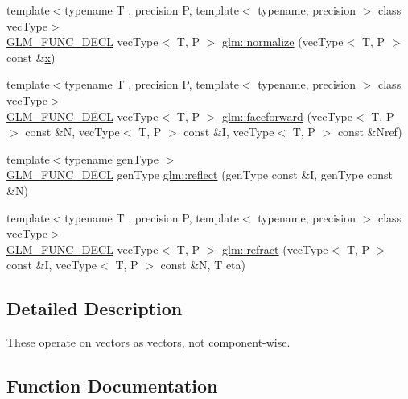 \begin{DoxyCompactItemize}
\item 
{\footnotesize template$<$typename T , precision P, template$<$ typename, precision $>$ class vec\+Type$>$ }\\\mbox{\hyperlink{setup_8hpp_ab2d052de21a70539923e9bcbf6e83a51}{G\+L\+M\+\_\+\+F\+U\+N\+C\+\_\+\+D\+E\+CL}} vec\+Type$<$ T, P $>$ \mbox{\hyperlink{group__core__func__geometric_gada9451ec170a36fe53552812b9c03a68}{glm\+::normalize}} (vec\+Type$<$ T, P $>$ const \&\mbox{\hyperlink{glad_8h_a92d0386e5c19fb81ea88c9f99644ab1d}{x}})
\item 
{\footnotesize template$<$typename T , precision P, template$<$ typename, precision $>$ class vec\+Type$>$ }\\\mbox{\hyperlink{setup_8hpp_ab2d052de21a70539923e9bcbf6e83a51}{G\+L\+M\+\_\+\+F\+U\+N\+C\+\_\+\+D\+E\+CL}} vec\+Type$<$ T, P $>$ \mbox{\hyperlink{group__core__func__geometric_gaea854e5aec1b5839832ac2dfc7cd3c0d}{glm\+::faceforward}} (vec\+Type$<$ T, P $>$ const \&N, vec\+Type$<$ T, P $>$ const \&I, vec\+Type$<$ T, P $>$ const \&Nref)
\item 
{\footnotesize template$<$typename gen\+Type $>$ }\\\mbox{\hyperlink{setup_8hpp_ab2d052de21a70539923e9bcbf6e83a51}{G\+L\+M\+\_\+\+F\+U\+N\+C\+\_\+\+D\+E\+CL}} gen\+Type \mbox{\hyperlink{group__core__func__geometric_gab63646fc36b81cf69d3ce123a72f76f2}{glm\+::reflect}} (gen\+Type const \&I, gen\+Type const \&N)
\item 
{\footnotesize template$<$typename T , precision P, template$<$ typename, precision $>$ class vec\+Type$>$ }\\\mbox{\hyperlink{setup_8hpp_ab2d052de21a70539923e9bcbf6e83a51}{G\+L\+M\+\_\+\+F\+U\+N\+C\+\_\+\+D\+E\+CL}} vec\+Type$<$ T, P $>$ \mbox{\hyperlink{group__core__func__geometric_gab7e7cdf4403931a5f7b74560ad64159b}{glm\+::refract}} (vec\+Type$<$ T, P $>$ const \&I, vec\+Type$<$ T, P $>$ const \&N, T eta)
\end{DoxyCompactItemize}


\subsection{Detailed Description}
These operate on vectors as vectors, not component-\/wise. 

\subsection{Function Documentation}
\mbox{\label{group__core__func__geometric_gafe2cae8cb26fd44be62aee97369d0af8}} 
